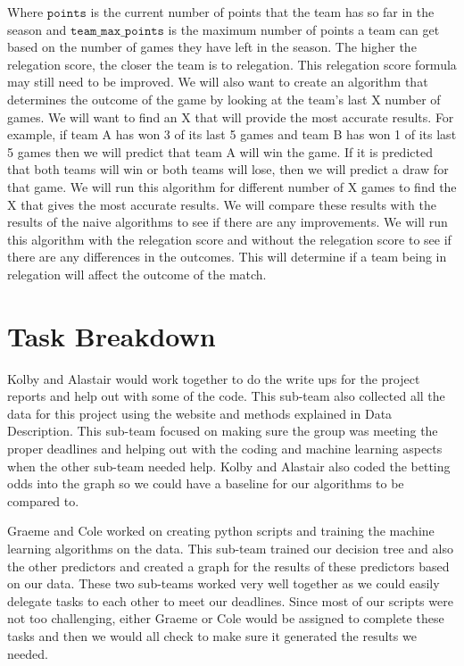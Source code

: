 \documentclass[conference]{IEEEtran}
\begin{document}
Where $\mathtt{points}$ is the current number of points that the team has so far in the season and $\mathtt{team\_max\_points}$ is the maximum number of points a team can get based on the number of games they have left in the season. The higher the relegation score, the closer the team is to relegation. This relegation score formula may still need to be improved.
We will also want to create an algorithm that determines the outcome of the game by looking at the team's last X number of games. We will want to find an X that will provide the most accurate results. For example, if team A has won 3 of its last 5 games and team B has won 1 of its last 5 games then we will predict that team A will win the game. If it is predicted that both teams will win or both teams will lose, then we will predict a draw for that game. We will run this algorithm for different number of X games to find the X that gives the most accurate results. We will compare these results with the results of the naive algorithms to see if there are any improvements. We will run this algorithm with the relegation score and without the relegation score to see if there are any differences in the outcomes. This will determine if a team being in relegation will affect the outcome of the match. 

\section{Task Breakdown}
Kolby and Alastair would work together to do the write ups for the project reports and help out with some of the code. This sub-team also collected all the data for this project using the website and methods explained in Data Description. This sub-team focused on making sure the group was meeting the proper deadlines and helping out with the coding and machine learning aspects when the other sub-team needed help. Kolby and Alastair also coded the betting odds into the graph so we could have a baseline for our algorithms to be compared to.

Graeme and Cole worked on creating python scripts and training the machine learning algorithms on the data. This sub-team trained our decision tree and also the other predictors and created a graph for the results of these predictors based on our data. These two sub-teams worked very well together as we could easily delegate tasks to each other to meet our deadlines. Since most of our scripts were not too challenging, either Graeme or Cole would be assigned to complete these tasks and then we would all check to make sure it generated the results we needed.
\end{document}
